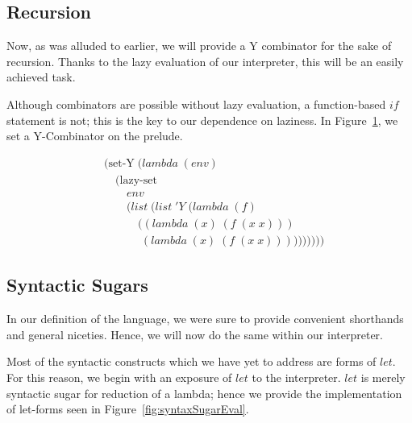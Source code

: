 \subsection{Recursion}
Now, as was alluded to earlier, we will provide a Y combinator for the 
sake of recursion. Thanks to the lazy evaluation of our interpreter, this 
will be an easily achieved task.

Although combinators are possible without lazy evaluation, a function-based 
$if$ statement is not; this is the key to our dependence on laziness. In 
Figure~\ref{fig:preludeY}, we set a Y-Combinator on the prelude.

\begin{figure}[htp]
\footnotesize
\caption{}\label{fig:preludeY}
\begin{align*}
& (\text{set-Y} \; (lambda \; (env)
\\& \quad (\text{lazy-set}
\\& \qquad env
\\& \qquad (list \; (list \; 'Y \; (lambda \; (f) \; 
\\& \qquad \quad ((lambda \; (x) \; (f \; (x \; x))) \; 
\\& \qquad \quad \; (lambda \; (x) \; (f \; (x \; x))))))))))
\end{align*}
\end{figure}

\subsection{Syntactic Sugars}
In our definition of the language, we were sure to provide convenient 
shorthands and general niceties. Hence, we will now do the same within our 
interpreter.

Most of the syntactic constructs which we have yet to address are forms of 
$let$. For this reason, we begin with an exposure of $let$ to the 
interpreter. $let$ is merely syntactic sugar for reduction of a lambda; hence 
we provide the implementation of let-forms seen in Figure~\ref{fig:syntaxSugarEval}.

